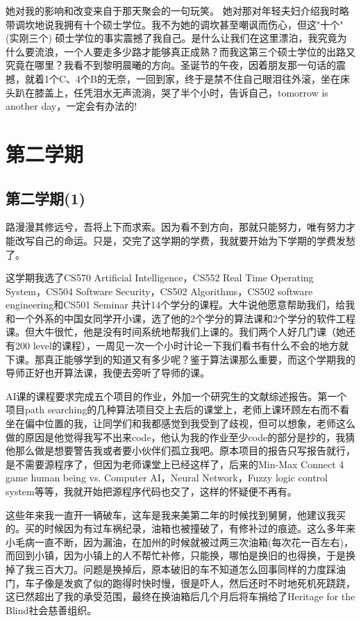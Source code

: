 \documentclass[12pt]{book}
\begin{document}
她对我的影响和改变来自于那天聚会的一句玩笑。 她对那对年轻夫妇介绍我时略带调坎地说我拥有十个硕士学位。我不为她的调坎甚至嘲讽而伤心，但这"十个"(实刚三个) 硕士学位的事实震撼了我自己。是什么让我们在这里漂泊，我究竟为什么要流浪，一个人要走多少路才能够真正成熟？而我这第三个硕士学位的出路又究竟在哪里？我看不到黎明晨曦的方向。圣诞节的午夜，因着朋友那一句话的震撼，就着1个C、4个B的无奈，一回到家，终于是禁不住自己眼泪往外滚，坐在床头趴在膝盖上，任凭泪水无声流淌，哭了半个小时，告诉自己，tomorrow is another day，一定会有办法的!

\chapter{第二学期}
\label{sec-4}
\section{第二学期(1)}
\label{sec-4-1}
路漫漫其修远兮，吾将上下而求索。因为看不到方向，那就只能努力，唯有努力才能改写自己的命运。只是，交完了这学期的学费，我就要开始为下学期的学费发愁了。

这学期我选了CS570 Artificial Intelligence，CS552 Real Time Operating System，CS504 Software Security，CS502 Algorithms，CS502 software engineering和CS501 Seminar 共计14个学分的课程。大牛说他愿意帮助我们，给我和一个外系的中国女同学开小课，选了他的2个学分的算法课和2个学分的软件工程课。但大牛很忙，他是没有时间系统地帮我们上课的。我们两个人好几门课（她还有200 level的课程），一周见一次一个小时计论一下我们看书有什么不会的地方就下课。那真正能够学到的知道又有多少呢？鉴于算法课那么重要，而这个学期我的导师正好也开算法课，我便去旁听了导师的课。

AI课的课程要求完成五个项目的作业，外加一个研究生的文献综述报告。第一个项目path searching的几种算法项目交上去后的课堂上，老师上课环顾左右而不看坐在偏中位置的我，让同学们和我都感觉到我受到了歧视，但可以想象，老师这么做的原因是他觉得我写不出来code，他认为我的作业至少code的部分是抄的，我猜他那么做是想要警告我或者要小伙伴们孤立我吧。原本项目的报告只写报告就行，是不需要源程序了，但因为老师课堂上已经这样了，后来的Min-Max Connect 4 game human being vs. Computer AI，Neural Network，Fuzzy logic control system等等，我就开始把源程序代码也交了，这样的怀疑便不再有。

这些年来我一直开一辆破车，这车是我来美第二年的时候找到舅舅，他建议我买的。买的时候因为有过车祸纪录，油箱也被撞破了，有修补过的痕迹。这么多年来小毛病一直不断，因为漏油，在加州的时候就被过两三次油箱(每次花一百左右)，而回到小镇，因为小镇上的人不帮忙补修，只能换，哪怕是换旧的也得换，于是换掉了我三百大刀。问题是换掉后，原本破旧的车不知道怎么回事同样的力度踩油门，车子像是发疯了似的跑得时快时慢，很是吓人，然后还时不时地死机死跷跷，这已然超出了我的承受范围，最终在换油箱后几个月后将车捐给了Heritage for the Blind社会慈善组织。
\end{document}
